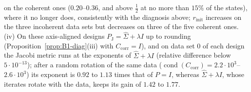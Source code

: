 on the coherent ones ($0.20$--$0.36$, and above $\frac12$ at no more than $15\%$ of the states), where it no longer
does, consistently with the diagnosis above; $r_{\mathrm{init}}$ increases on the three incoherent data sets but
decreases on three of the five coherent ones.
(iv) On these axis-aligned designs $P_{\mathrm J}=\hat\Sigma+\lambda I$ up to rounding (Proposition~\ref{prop:B1-diag}(iii)
with $C_{\mathrm{corr}}=I$), and on data set $0$ of each design the Jacobi metric runs at the exponents of
$\hat\Sigma+\lambda I$ (relative difference below $5\cdot10^{-13}$); after a random rotation
of the same data ($\operatorname{cond}(C_{\mathrm{corr}})=2.2\cdot10^3$--$2.6\cdot10^3$) its exponent is $0.92$ to $1.13$
times that of $P=I$, whereas $\hat\Sigma+\lambda I$, whose iterates rotate with the data, keeps its gain of $1.42$ to
$1.77$.
